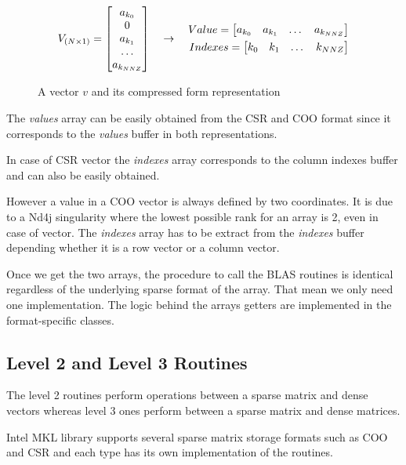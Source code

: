 \begin{figure}[h]
	\[
	\centering
	V_{(N\times 1)} = 
	\begin{bmatrix}
	a_{k_{0}}\\
	0\\
	a_{k_{1}}\\
	\dots\\
	a_{k_{NNZ}}
	\end{bmatrix}
	\quad\rightarrow\quad
	\begin{aligned}
		Value = 
		\begin{bmatrix}
		a_{k_{0}}& a_{{k_{1}}} & \dots & a_{k_{NNZ}}
		\end{bmatrix}\\
		Indexes = 
		\begin{bmatrix}
		k_{0} & k_{1} & \dots & k_{NNZ}		
		\end{bmatrix}
	\end{aligned}
	\]
	\caption{A vector $v$ and its compressed form representation}
	\label{fig:compressedVector}
\end{figure}


The \textit{values} array can be easily obtained from the CSR and COO format since it corresponds to the \textit{values} buffer in both representations.

In case of CSR vector the \textit{indexes} array corresponds to the column indexes buffer and can also be easily obtained.

However a value in a COO vector is always defined by two coordinates. It is due to a Nd4j singularity where the lowest possible rank for an array is 2, even in case of vector. The \textit{indexes} array has to be extract from the \textit{indexes} buffer depending whether it is a row vector or a column vector.

Once we get the two arrays, the procedure to call the BLAS routines is identical regardless of the underlying sparse format of the array. That mean we only need one implementation. The logic behind the arrays getters are implemented in the format-specific classes. 


\subsection{Level 2 and Level 3 Routines}

The level 2 routines perform operations between a sparse matrix and dense vectors whereas level 3 ones perform between a sparse matrix and dense matrices.

Intel MKL library supports several  sparse matrix storage formats such as COO and CSR and each type has its own implementation of the routines.

